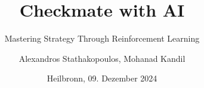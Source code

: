 %
% 
% 
%





\renewcommand{\PersonTitel}{}
\newcommand{\Datum}{\today}

\renewcommand{\PraesentationFusszeileZusatz}{}

\title{Checkmate with AI}
\subtitle{Mastering Strategy Through Reinforcement Learning}
\author{Alexandros Stathakopoulos, Mohanad Kandil}
\institute[]{\UniversitaetName}
\date[\Datum]{Heilbronn, 09. Dezember 2024}
\subject{}



\graphicspath{ {Ressourcen/_Bilder/} }
\PraesentationMasterStandard

\PraesentationTitelseite %

